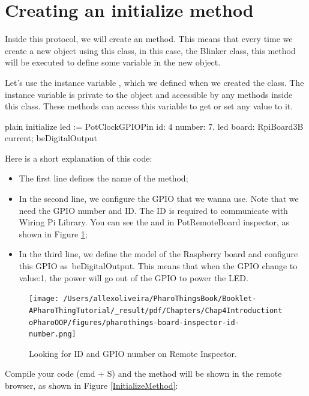 \documentclass[10pt,twoside,english]{_support/latex/sbabook/sbabook}
\begin{document}
\section{Creating an initialize method}
Inside this protocol, we will create an  method. This means that every time we create a new object using this class, in this case, the Blinker class, this method will be executed to define some variable in the new object.

Let's use the instance variable , which we defined when we created the class. The instance variable is private to the object and accessible by any methods inside this class. These methods can access this variable to get or set any value to it.

\begin{displaycode}{plain}
initialize 
  led := PotClockGPIOPin id: 4 number: 7. 
  led board: RpiBoard3B current; beDigitalOutput
\end{displaycode}

Here is a short explanation of this code:

\begin{itemize}
\item The first line defines the name of the method;
\item In the second line, we configure the GPIO that we wanna use. Note that we need the GPIO number and ID. The ID is required to communicate with Wiring Pi Library. You can see the  and  in PotRemoteBoard inspector, as shown in Figure \ref{RemoteInspector};
\item In the third line, we define the model of the Raspberry board and configure this GPIO as beDigitalOutput. This means that when the GPIO change to value:1, the power will go out of the GPIO to power the LED.
\end{itemize}


\begin{figure}

\begin{center}
\texttt{[image: /Users/allexoliveira/PharoThingsBook/Booklet-APharoThingTutorial/\_result/pdf/Chapters/Chap4IntroductiontoPharoOOP/figures/pharothings-board-inspector-id-number.png]}\caption{Looking for ID and GPIO number on Remote Inspector.\label{RemoteInspector}}\end{center}
\end{figure}


Compile your code (cmd + S) and the method will be shown in the remote browser, as shown in Figure \ref{InitializeMethod}:
\end{document}
